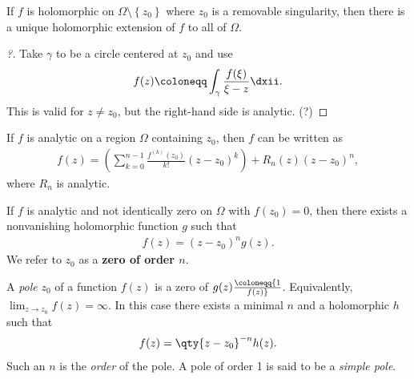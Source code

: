 \begin{theorem}

If \(f\) is holomorphic on \(\Omega\setminus\left\{{z_0}\right\}\) where
\(z_0\) is a removable singularity, then there is a unique holomorphic
extension of \(f\) to all of \(\Omega\).

\end{theorem}

\begin{proof}[?]

Take \(\gamma\) to be a circle centered at \(z_0\) and use
\begin{align*}
f(z) \coloneqq\int_\gamma { f(\xi) \over \xi - z} \dxii
.\end{align*}
This is valid for \(z\neq z_0\), but the right-hand side is analytic.
(?)

\end{proof}


\begin{theorem}

If \(f\) is analytic on a region \(\Omega\) containing \(z_0\), then
\(f\) can be written as
\begin{align*}
f(z)
=\left(\sum_{k=0}^{n-1} \frac{f^{(k)}\left(z_{0}\right)}{k !}\left(z-z_{0}\right)^{k}\right)+ 
R_{n}(z)\left(z-z_{0}\right)^{n}
,\end{align*}
where \(R_n\) is analytic.

\end{theorem}

\begin{definition}[Zeros]

If \(f\) is analytic and not identically zero on \(\Omega\) with
\(f(z_0) = 0\), then there exists a nonvanishing holomorphic function
\(g\) such that
\begin{align*}
f(z) = (z-z_0)^n g(z)
.\end{align*}
We refer to \(z_0\) as a \textbf{zero of order \(n\)}.

\end{definition}

\begin{definition}

A \emph{pole} \(z_0\) of a function \(f(z)\) is a zero of
\(g(z) \coloneqq{1\over f(z)}\). Equivalently,
\(\lim_{z\to z_0} f(z) = \infty\). In this case there exists a minimal
\(n\) and a holomorphic \(h\) such that
\begin{align*}  
f(z) = \qty{z-z_0}^{-n} h(z)
.\end{align*}
Such an \(n\) is the \emph{order} of the pole. A pole of order 1 is said
to be a \emph{simple pole}.

\end{definition}

